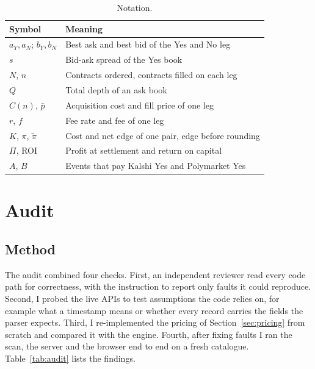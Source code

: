 \documentclass[5p,letterpaper]{elsarticle}
\begin{document}
\begin{table}[tbp]
\caption{Notation.}\label{tab:notation}
\footnotesize
\begin{tabularx}{\columnwidth}{@{}lL@{}}
\toprule
Symbol & Meaning \\
\midrule
$a_Y, a_N$; $b_Y, b_N$ & Best ask and best bid of the Yes and No leg \\
$s$ & Bid-ask spread of the Yes book \\
$N$, $n$ & Contracts ordered, contracts filled on each leg \\
$Q$ & Total depth of an ask book \\
$C(n)$, $\bar p$ & Acquisition cost and fill price of one leg \\
$r$, $f$ & Fee rate and fee of one leg \\
$K$, $\pi$, $\tilde\pi$ & Cost and net edge of one pair, edge before rounding \\
$\Pi$, ROI & Profit at settlement and return on capital \\
$A$, $B$ & Events that pay Kalshi Yes and Polymarket Yes \\
\bottomrule
\end{tabularx}
\end{table}

\section{Audit}\label{sec:audit}

\subsection{Method}

The audit combined four checks. First, an independent reviewer read every code path for correctness, with the instruction to report only faults it could reproduce. Second, I probed the live APIs to test assumptions the code relies on, for example what a timestamp means or whether every record carries the fields the parser expects. Third, I re-implemented the pricing of Section~\ref{sec:pricing} from scratch and compared it with the engine. Fourth, after fixing faults I ran the scan, the server and the browser end to end on a fresh catalogue. Table~\ref{tab:audit} lists the findings.
\end{document}
